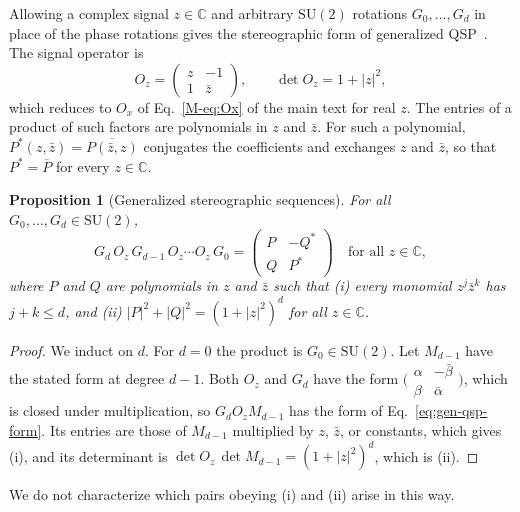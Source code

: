 \documentclass[
    reprint,
    amsmath,amssymb,
    aps,
    pra,
    superscriptaddress,
    floatfix
]{revtex4-2}
\theoremstyle{aps}
\newtheorem{proposition}[theorem]{Proposition}
\newcommand{\C}{\mathbb{C}}
\newcommand{\SU}{\mathrm{SU}}
\begin{document}
Allowing a complex signal $z\in\C$ and arbitrary $\SU(2)$ rotations
$G_0,\dots,G_d$ in place of the phase rotations gives the
stereographic form of generalized QSP~\cite{MotlaghWiebe2023}.  The
signal operator is
\begin{equation}
	O_z=\begin{pmatrix} z & -1 \\ 1 & \bar z\end{pmatrix},
	\qquad \det O_z=1+|z|^2,
	\label{eq:Oz}
\end{equation}
which reduces to $O_x$ of Eq.~\eqref{M-eq:Ox} of the main text for real $z$.  The
entries of a product of such factors are polynomials in $z$ and
$\bar z$.  For such a polynomial, $P^*(z,\bar z)=
\overline{P(\bar z,z)}$ conjugates the coefficients and exchanges
$z$ and $\bar z$, so that $P^*=\overline{P}$ for every $z\in\C$.

\begin{proposition}[Generalized stereographic sequences]
	\label{thm:gen-qsp}
	For all $G_0,\dots,G_d\in\SU(2)$,
	\begin{equation}
		G_d\,O_z\,G_{d-1}\,O_z\cdots O_z\,G_0
		=\begin{pmatrix} P & -Q^*\\ Q & P^*\end{pmatrix}
		\quad\text{for all }z\in\C,
		\label{eq:gen-qsp-form}
	\end{equation}
	where $P$ and $Q$ are polynomials in $z$ and $\bar z$ such that
	(i) every monomial $z^j\bar z^k$ has $j+k\le d$, and (ii)
	$|P|^2+|Q|^2=(1+|z|^2)^d$ for all $z\in\C$.
\end{proposition}

\begin{proof}
	We induct on $d$.  For $d=0$ the product is $G_0\in\SU(2)$.
	Let $M_{d-1}$ have the stated form at degree $d-1$.  Both
	$O_z$ and $G_d$ have the form
	$\bigl(\begin{smallmatrix}\alpha&-\bar\beta\\
	\beta&\bar\alpha\end{smallmatrix}\bigr)$, which is closed
	under multiplication, so $G_dO_zM_{d-1}$ has the form of
	Eq.~\eqref{eq:gen-qsp-form}.  Its entries are those of
	$M_{d-1}$ multiplied by $z$, $\bar z$, or constants, which
	gives (i), and its determinant is
	$\det O_z\,\det M_{d-1}=(1+|z|^2)^d$, which is (ii).
\end{proof}

We do not characterize which pairs obeying (i) and (ii) arise in
this way.
\end{document}

